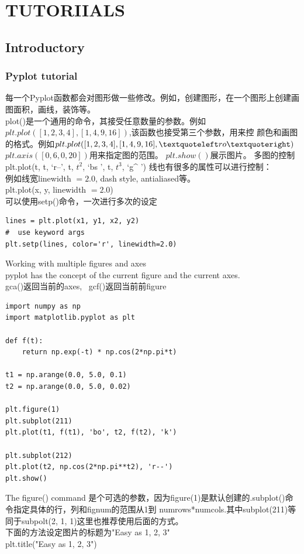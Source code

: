 \chapter{TUTORIIALS}
\section{Introductory}
\subsection{Pyplot tutorial}
每一个Pyplot函数都会对图形做一些修改。例如，创建图形，在一个图形上创建画图面积，画线，装饰等。\\
plot()是一个通用的命令，其接受任意数量的参数。例如$plt.plot([1, 2, 3, 4], [1, 4, 9, 16])$,该函数也接受第三个参数，用来控
颜色和画图的格式。例如$plt.plot([1, 2, 3, 4], [1, 4, 9, 16], \textquoteleft ro \textquoteright)$
$plt.axis([0, 6, 0, 20])$用来指定图的范围。\newline
$plt.show()$展示图片。\newline
多图的控制plt.plot(t, t, \textquoteleft r--\textquoteright, t, $t^{2}$, \textquoteleft bs \textquoteright, t, $t^{3}$, \textquoteleft g\^{} \textquoteright)\newline
线也有很多的属性可以进行控制：\\
例如线宽linewidth $= 2.0$, dash style, antialiased等。\\
plt.plot(x, y, linewidth $= 2.0$)\\
可以使用setp()命令，一次进行多次的设定\\
\begin{verbatim}
lines = plt.plot(x1, y1, x2, y2)
#  use keyword args
plt.setp(lines, color='r', linewidth=2.0)
\end{verbatim}

\noindent{}Working with multiple figures and axes\\
pyplot has the concept of the current figure and the current axes.\\
gca()返回当前的axes,~ gcf()返回当前前figure\\
\begin{lstlisting}
import numpy as np
import matplotlib.pyplot as plt

def f(t):
    return np.exp(-t) * np.cos(2*np.pi*t)

t1 = np.arange(0.0, 5.0, 0.1)
t2 = np.arange(0.0, 5.0, 0.02)

plt.figure(1)
plt.subplot(211)
plt.plot(t1, f(t1), 'bo', t2, f(t2), 'k')

plt.subplot(212)
plt.plot(t2, np.cos(2*np.pi**t2), 'r--')
plt.show()
\end{lstlisting}
The figure() command 是个可选的参数，因为figure(1)是默认创建的.subplot()命令指定具体的行，列和fignum的范围从1到
numrows*numcols.其中subplot(211)等同于subpolt(2, 1, 1)这里也推荐使用后面的方式。\\
下面的方法设定图片的标题为"Easy as 1, 2, 3"\\
\hspace{1cm}plt.title("Easy as 1, 2, 3")\\

